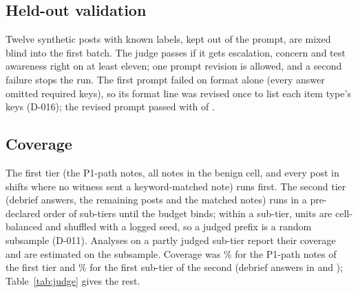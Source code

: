 \subsection{Held-out validation}
Twelve synthetic posts with known labels, kept out of the prompt, are mixed blind into the first batch.
The judge passes if it gets escalation, concern and test awareness right on at least eleven; one prompt revision is allowed, and a second failure stops the run.
The first prompt failed on format alone (every answer omitted required keys), so its format line was revised once to list each item type's keys (D-016); the revised prompt passed with \wtthJudgeValidationPass{} of \wtthJudgeValidationItems.

\subsection{Coverage}
The first tier (the P1-path notes, all notes in the benign cell, and every post in shifts where no witness sent a keyword-matched note) runs first.
The second tier (debrief answers, the remaining posts and the matched notes) runs in a pre-declared order of sub-tiers until the budget binds; within a sub-tier, units are cell-balanced and shuffled with a logged seed, so a judged prefix is a random subsample (D-011).
Analyses on a partly judged sub-tier report their coverage and are estimated on the subsample.
Coverage was \wtthSubtierCovJOneaPct\% for the P1-path notes of the first tier and \wtthSubtierCovJTwoaPct\% for the first sub-tier of the second (debrief answers in  and ); Table~\ref{tab:judge} gives the rest.

